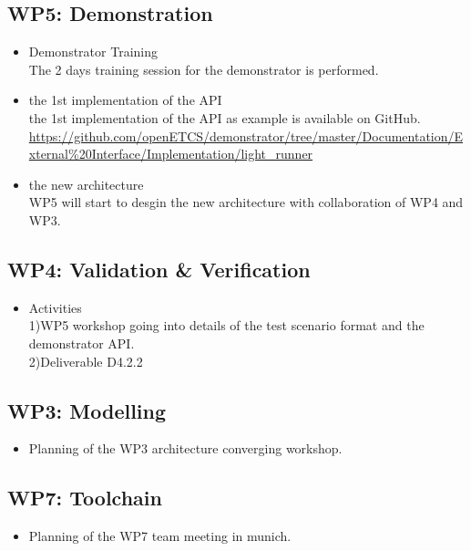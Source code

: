 \documentclass[a4paper, 11pt]{article}
\begin{document}
\subsection{WP5: Demonstration}
\begin{itemize}
\item Demonstrator Training\\
The 2 days training session for the demonstrator is performed.\\
\item the 1st implementation of the API\\
 the 1st implementation of the API as example is available on GitHub.\\
\url{https://github.com/openETCS/demonstrator/tree/master/Documentation/External%20Interface/Implementation/light_runner}


\item the new architecture\\
WP5 will start to desgin the new architecture with collaboration of WP4 and WP3.

\end{itemize}

\subsection{WP4: Validation \& Verification}
\begin{itemize}

\item Activities\\
1)WP5 workshop going into details of the test scenario format and the demonstrator API.\\
2)Deliverable D4.2.2
\end{itemize}

\subsection{WP3: Modelling}
\begin{itemize}

\item Planning of the WP3 architecture converging workshop. 


\end{itemize}

\subsection{WP7: Toolchain}

\begin{itemize}
\item Planning of the WP7 team meeting in munich. 

\end{itemize}
\end{document}
